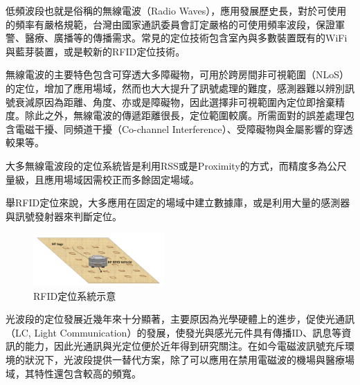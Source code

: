         
        低頻波段也就是俗稱的無線電波（Radio Waves），應用發展歷史長，對於可使用的頻率有嚴格規範，台灣由國家通訊委員會訂定嚴格的可使用頻率波段\cite{rf_law}，保證軍警、醫療、廣播等的傳播需求。常見的定位技術包含室內與多數裝置既有的WiFi與藍芽裝置，或是較新的RFID定位技術。
        
        無線電波的主要特色包含可穿透大多障礙物，可用於跨房間非可視範圍（NLoS）的定位\cite{survey_indoor2018}，增加了應用場域，然而也大大提升了訊號處理的難度，感測器難以辨別訊號衰減原因為距離、角度、亦或是障礙物，因此選擇非可視範圍內定位即捨棄精度。除此之外，無線電波的傳遞距離很長，定位範圍較廣。所需面對的誤差處理包含電磁干擾、同頻道干擾（Co-channel Interference）、受障礙物與金屬影響的穿透較果等。

        大多無線電波段的定位系統皆是利用RSS或是Proximity的方式，而精度多為公尺量級，且應用場域因需校正而多餘固定場域。
        
        舉RFID定位來說，大多應用在固定的場域中建立數據庫，或是利用大量的感測器與訊號發射器來判斷定位\cite{survey_rfid}。

        \begin{figure}[ht]
            \centering
            \includegraphics[width=5cm]{ch2pic/rfid_system.png}
            \caption{RFID定位系統示意\cite{survey_rfid}}
            \label{pic:rfid_system}
        \end{figure}




        光波段的定位發展近幾年來十分顯著，主要原因為光學硬體上的進步，促使光通訊（LC, Light Communication）的發展，使發光與感光元件具有傳播ID、訊息等資訊的能力，因此光通訊與光定位便於近年得到研究關注。在如今電磁波訊號充斥環境的狀況下，光波段提供一替代方案，除了可以應用在禁用電磁波的機場與醫療場域，其特性還包含較高的頻寬。
        

